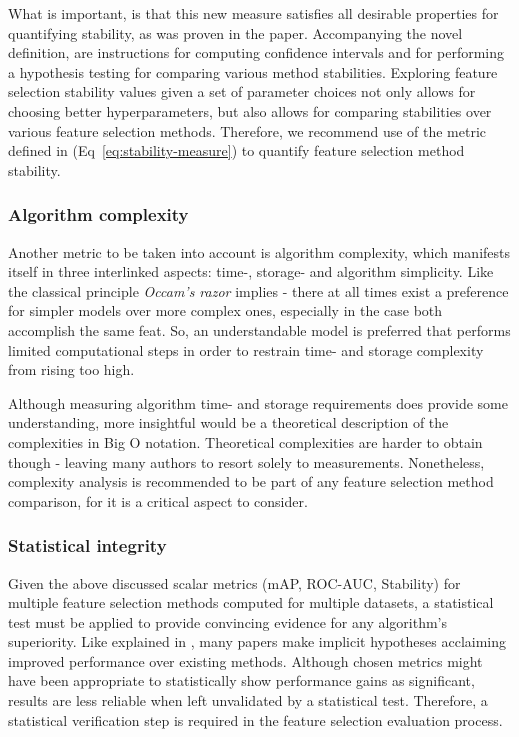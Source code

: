 \documentclass{article}
\begin{document}
What is important, is that this new measure satisfies all desirable properties for quantifying stability, as was proven in the paper. Accompanying the novel definition, are instructions for computing confidence intervals and for performing a hypothesis testing for comparing various method stabilities. Exploring feature selection stability values given a set of parameter choices not only allows for choosing better hyperparameters, but also allows for comparing stabilities over various feature selection methods. Therefore, we recommend use of the metric defined in (Eq~\ref{eq:stability-measure}) to quantify feature selection method stability.

\subsubsection{Algorithm complexity}
Another metric to be taken into account is algorithm complexity, which manifests itself in three interlinked aspects: time-, storage- and algorithm simplicity. Like the classical principle \textit{Occam's razor} implies - there at all times exist a preference for simpler models over more complex ones, especially in the case both accomplish the same feat. So, an understandable model is preferred that performs limited computational steps in order to restrain time- and storage complexity from rising too high.

Although measuring algorithm time- and storage requirements does provide some understanding, more insightful would be a theoretical description of the complexities in Big O notation. Theoretical complexities are harder to obtain though - leaving many authors to resort solely to measurements. Nonetheless, complexity analysis is recommended to be part of any feature selection method comparison, for it is a critical aspect to consider.

\subsubsection{Statistical integrity}\label{sec:evaluation-statistical-integrity}
Given the above discussed scalar metrics (mAP, ROC-AUC, Stability) for multiple feature selection methods computed for multiple datasets, a statistical test must be applied to provide convincing evidence for any algorithm's superiority. Like explained in \citep{demvsar2006statistical}, many papers make implicit hypotheses acclaiming improved performance over existing methods. Although chosen metrics might have been appropriate to statistically show performance gains as significant, results are less reliable when left unvalidated by a statistical test. Therefore, a statistical verification step is required in the feature selection evaluation process.
\end{document}
